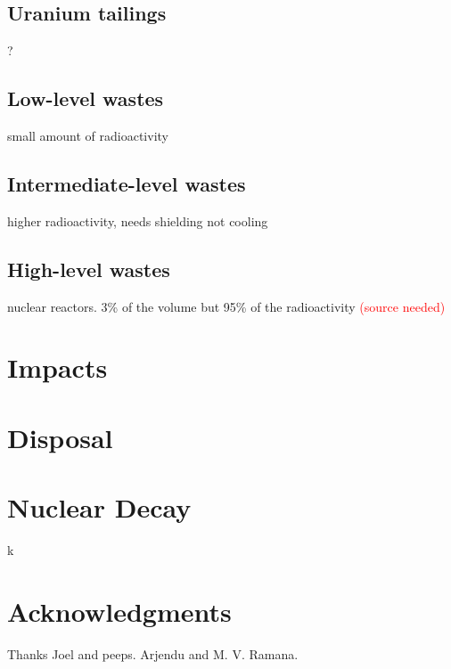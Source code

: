 \documentclass[preprint,aip,cha]{revtex4-1}
\newcommand{\red}[1]{\textcolor{red}{#1}}
\begin{document}
    \subsection{Uranium tailings}
    ?

    \subsection{Low-level wastes}
    small amount of radioactivity

    \subsection{Intermediate-level wastes}
    higher radioactivity, needs shielding not cooling

    \subsection{High-level wastes}
    nuclear reactors. 3\% of the volume but 95\% of the radioactivity \red{(source needed)}

\section{Impacts}

\section{Disposal}


\section{Nuclear Decay}
k

\section{Acknowledgments}
Thanks Joel and peeps. Arjendu and M. V. Ramana.

\pagebreak
{}


\end{document}
